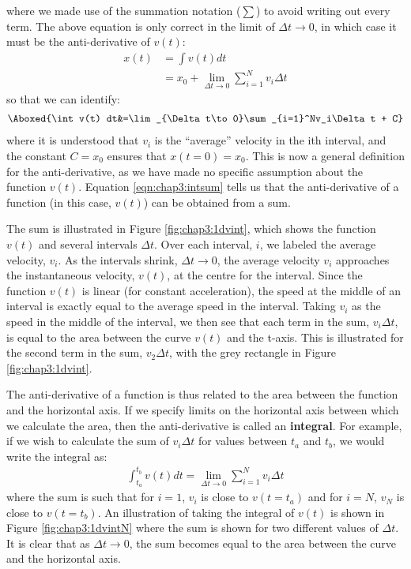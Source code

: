 
where we made use of the summation notation ($\sum$) to avoid writing out every term. The above equation is only correct in the limit of $\Delta t\to 0$, in which case it must be the anti-derivative of $v(t)$:
\begin{align*}
x(t) &= \int v(t) dt\\
     &= x_0+\lim_{\Delta t\to 0}\sum_{i=1}^Nv_i\Delta t 
\end{align*}
so that we can identify:
\begin{align}
\label{eqn:chap3:intsum}
\Aboxed{\int v(t) dt&=\lim_{\Delta t\to 0}\sum_{i=1}^Nv_i\Delta t + C}
\end{align}
where it is understood that $v_i$ is the ``average'' velocity in the ith interval, and the constant $C=x_0$ ensures that $x(t=0)=x_0$. This is now a general definition for the anti-derivative, as we have made no specific assumption about the function $v(t)$. Equation \ref{eqn:chap3:intsum} tells us that the anti-derivative of a function (in this case, $v(t)$) can be obtained from a sum.

The sum is illustrated in Figure \ref{fig:chap3:1dvint}, which shows the function $v(t)$ and several intervals $\Delta t$. Over each interval, $i$, we labeled the average velocity, $v_i$. As the intervals shrink, $\Delta t\to 0$, the average velocity $v_i$ approaches the instantaneous velocity, $v(t)$, at the centre for the interval. Since the function $v(t)$ is linear (for constant acceleration), the speed at the middle of an interval is exactly equal to the average speed in the interval. Taking $v_i$ as the speed in the middle of the interval, we then see that each term in the sum, $v_i\Delta t$, is equal to the area between the curve $v(t)$ and the t-axis. This is illustrated for the second term in the sum, $v_2\Delta t$, with the grey rectangle in Figure \ref{fig:chap3:1dvint}.

The anti-derivative of a function is thus related to the area between the function and the horizontal axis. If we specify limits on the horizontal axis between which we calculate the area, then the anti-derivative is called an \textbf{integral}. For example, if we wish to calculate the sum of $v_i \Delta t$ for values between $t_a$ and $t_b$, we would write the integral as:
\begin{align*}
\int_{t_a}^{t_b}v(t) dt = \lim_{\Delta t\to 0}\sum_{i=1}^Nv_i\Delta t 
\end{align*}
where the sum is such that for $i=1$, $v_i$ is close to $v(t=t_a)$ and for $i=N$, $v_N$ is close to $v(t=t_b)$. An illustration of taking the integral of $v(t)$ is shown in Figure \ref{fig:chap3:1dvintN} where the sum is shown for two different values of $\Delta t$. It is clear that as $\Delta t \to 0$, the sum becomes equal to the area between the curve and the horizontal axis.

